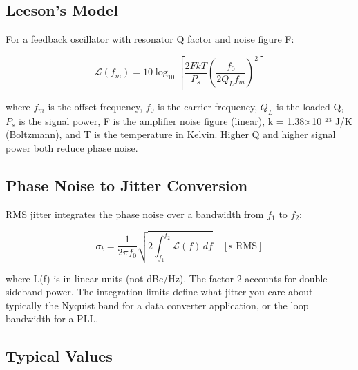       

\subsection{Leeson's Model}

      

For a feedback oscillator with resonator Q factor and noise figure F:

      
\[\mathcal{L}(f_m) = 10\log_{10}\!\left[\dfrac{2FkT}{P_s}\!\left(\dfrac{f_0}{2Q_L f_m}\right)^2\right]\]

      

where $f_m$ is the offset frequency, $f_0$ is the carrier frequency, $Q_L$ is the loaded Q, $P_s$ is the signal power, F is the amplifier noise figure (linear), k = 1.38×10⁻²³ J/K (Boltzmann), and T is the temperature in Kelvin. Higher Q and higher signal power both reduce phase noise.

      

\subsection{Phase Noise to Jitter Conversion}

      

RMS jitter integrates the phase noise over a bandwidth from $f_1$ to $f_2$:


      
\[\sigma_t = \dfrac{1}{2\pi f_0}\sqrt{2\int_{f_1}^{f_2}\mathcal{L}(f)\,df}\quad[\text{s RMS}]\]

      

where L(f) is in linear units (not dBc/Hz). The factor 2 accounts for double-sideband power. The integration limits define what jitter you care about — typically the Nyquist band for a data converter application, or the loop bandwidth for a PLL.

      

\subsection{Typical Values}

      
        
        
        
        
        
        
      

